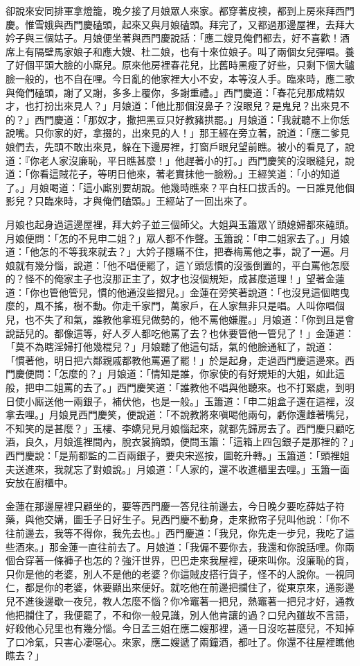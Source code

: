 卻說來安同排軍拿燈籠，晚夕接了月娘眾人來家。都穿著皮襖，都到上房來拜西門慶。惟雪娥與西門慶磕頭，起來又與月娘磕頭。拜完了，又都過那邊屋裡，去拜大妗子與三個姑子。月娘便坐著與西門慶說話：「應二嫂見俺們都去，好不喜歡！酒席上有隔壁馬家娘子和應大嫂、杜二娘，也有十來位娘子。叫了兩個女兒彈唱。養了好個平頭大臉的小廝兒。原來他房裡春花兒，比舊時黑瘦了好些，只剩下個大驢臉一般的，也不自在哩。今日亂的他家裡大小不安，本等沒人手。臨來時，應二歌與俺們磕頭，謝了又謝，多多上覆你，多謝重禮。」西門慶道：「春花兒那成精奴才，也打扮出來見人？」月娘道：「他比那個沒鼻子？沒眼兒？是鬼兒？出來見不的？」西門慶道：「那奴才，撒把黑豆只好教豬拱罷。」月娘道：「我就聽不上你恁說嘴。只你家的好，拿掇的，出來見的人！」那王經在旁立著，說道：「應二爹見娘們去，先頭不敢出來見，躲在下邊房裡，打窗戶眼兒望前瞧。被小的看見了，說道：『你老人家沒廉恥，平日瞧甚麼！」他趕著小的打。」西門慶笑的沒眼縫兒，說道：「你看這賊花子，等明日他來，著老實抹他一臉粉。」王經笑道：「小的知道了。」月娘喝道：「這小廝別要胡說。他幾時瞧來？平白枉口拔舌的。一日誰見他個影兒？只臨來時，才與俺們磕頭。」王經站了一回出來了。

月娘也起身過這邊屋裡，拜大妗子並三個師父。大姐與玉簫眾丫頭媳婦都來磕頭。月娘便問：「怎的不見申二姐？」眾人都不作聲。玉簫說：「申二姐家去了。」月娘道：「他怎的不等我來就去？」大妗子隱瞞不住，把春梅罵他之事，說了一遍。月娘就有幾分惱，說道：「他不唱便罷了，這丫頭恁慣的沒張倒置的，平白罵他怎麼的？怪不的俺家主子也沒那正主了，奴才也沒個規矩，成甚麼道理！」望著金蓮道：「你也管他管兒，慣的他通沒些摺兒。」金蓮在旁笑著說道：「也沒見這個瞎曳麼的，風不搖，樹不動。你走千家門，萬家戶，在人家無非只是唱。人叫你唱個兒，也不失了和氣，誰教他拿班兒做勢的，他不罵他嫌腥。」月娘道：「你到且是會說話兒的。都像這等，好人歹人都吃他罵了去？也休要管他一管兒了！」金蓮道：「莫不為瞎淫婦打他幾棍兒？」月娘聽了他這句話，氣的他臉通紅了，說道： 「慣著他，明日把六鄰親戚都教他罵遍了罷！」於是起身，走過西門慶這邊來。西門慶便問：「怎麼的？」月娘道：「情知是誰，你家使的有好規矩的大姐，如此這般，把申二姐罵的去了。」西門慶笑道：「誰教他不唱與他聽來。也不打緊處，到明日使小廝送他一兩銀子，補伏他，也是一般。」玉簫道：「申二姐盒子還在這裡，沒拿去哩。」月娘見西門慶笑，便說道：「不說教將來嗔喝他兩句，虧你還雌著嘴兒，不知笑的是甚麼？」玉樓、李嬌兒見月娘惱起來，就都先歸房去了。西門慶只顧吃酒，良久，月娘進裡間內，脫衣裳摘頭，便問玉簫：「這箱上四包銀子是那裡的？」西門慶說：「是荊都監的二百兩銀子，要央宋巡按，圖乾升轉。」玉簫道：「頭裡姐夫送進來，我就忘了對娘說。」月娘道：「人家的，還不收進櫃里去哩。」玉簫一面安放在廚櫃中。

金蓮在那邊屋裡只顧坐的，要等西門慶一答兒往前邊去，今日晚夕要吃薛姑子符藥，與他交媾，圖壬子日好生子。見西門慶不動身，走來掀帘子兒叫他說：「你不往前邊去，我等不得你，我先去也。」西門慶道：「我兒，你先走一步兒，我吃了這些酒來。」那金蓮一直往前去了。月娘道：「我偏不要你去，我還和你說話哩。你兩個合穿著一條褲子也怎的？強汗世界，巴巴走來我屋裡，硬來叫你。沒廉恥的貨，只你是他的老婆，別人不是他的老婆？你這賊皮搭行貨子，怪不的人說你。一視同仁，都是你的老婆，休要顯出來便好。就吃他在前邊把攔住了，從東京來，通影邊兒不進後邊歇一夜兒，教人怎麼不惱？你冷竈著一把兒，熱竈著一把兒才好，通教他把攔住了，我便罷了，不和你一般見識，別人他肯讓的過？口兒內雖故不言語，好殺他心兒里也有幾分惱。今日孟三姐在應二嫂那裡，通一日沒吃甚麼兒，不知掉了口冷氣，只害心凄噁心。來家，應二嫂遞了兩鐘酒，都吐了。你還不往屋裡瞧他瞧去？」

